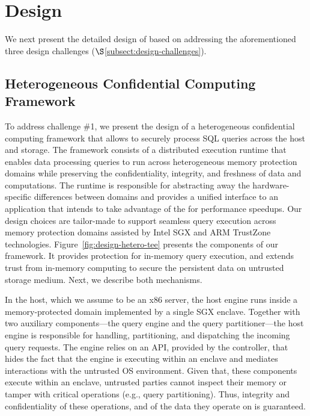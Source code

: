\section{Design}
\label{sec:design}
We next present the detailed design of \project{} based on addressing the aforementioned three design challenges ($\S$\ref{subsect:design-challenges}).

\subsection{Heterogeneous Confidential Computing Framework}
\label{subsec:design-sef}

To address challenge \#1, we present the design of a heterogeneous confidential computing framework that allows to securely process SQL queries across the host and storage. The framework consists of a distributed execution runtime that enables data processing queries to run across heterogeneous memory protection domains while preserving the confidentiality, integrity, and freshness of data and computations. The runtime is responsible for abstracting away the hardware-specific differences between domains and provides a unified interface to an application that intends to take advantage of the \csd for performance speedups. Our design choices are tailor-made to support seamless query execution across memory protection domains assisted by Intel SGX and ARM TrustZone technologies. Figure~\ref{fig:design-hetero-tee} presents the components of our framework. It provides protection for in-memory query execution, and extends trust from in-memory computing to secure the persistent data on untrusted storage medium. Next, we describe both mechanisms.

 In the host, which we assume to be an x86 server, the host engine runs inside a memory-protected domain implemented by a single SGX enclave. Together with two auxiliary components---the query engine and the query partitioner---the host engine is responsible for handling, partitioning, and dispatching the incoming query requests. The engine relies on an API, provided by the controller, that hides the fact that the engine is executing within an enclave and mediates interactions with the untrusted OS environment. Given that, these components execute within an enclave, untrusted parties cannot inspect their memory or tamper with critical operations (e.g., query partitioning). Thus, integrity and confidentiality of these operations, and of the data they operate on is guaranteed. %

